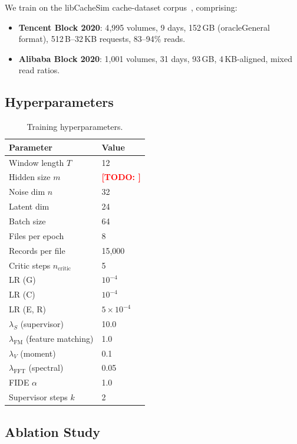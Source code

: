 \documentclass[10pt,twocolumn]{article}
\newcommand{\todo}[1]{\textcolor{red}{\textbf{[TODO: #1]}}}
\begin{document}
We train on the libCacheSim cache-dataset corpus~\cite{yang2021libcachesim,yang2023fifo},
comprising:
\begin{itemize}
  \item \textbf{Tencent Block 2020}: 4{,}995 volumes, 9 days, 152\,GB
    (oracleGeneral format), 512\,B--32\,KB requests, 83--94\% reads.
  \item \textbf{Alibaba Block 2020}: 1{,}001 volumes, 31 days, 93\,GB,
    4\,KB-aligned, mixed read ratios.
\end{itemize}

\subsection{Hyperparameters}

\begin{table}[h]
\centering
\small
\begin{tabular}{ll}
\toprule
Parameter & Value \\
\midrule
Window length $T$ & 12 \\
Hidden size $m$ & \todo{} \\
Noise dim $n$ & 32 \\
Latent dim & 24 \\
Batch size & 64 \\
Files per epoch & 8 \\
Records per file & 15{,}000 \\
Critic steps $n_{\text{critic}}$ & 5 \\
LR (G) & $10^{-4}$ \\
LR (C) & $10^{-4}$ \\
LR (E, R) & $5 \times 10^{-4}$ \\
$\lambda_S$ (supervisor) & 10.0 \\
$\lambda_{\text{FM}}$ (feature matching) & 1.0 \\
$\lambda_V$ (moment) & 0.1 \\
$\lambda_{\text{FFT}}$ (spectral) & 0.05 \\
FIDE $\alpha$ & 1.0 \\
Supervisor steps $k$ & 2 \\
\bottomrule
\end{tabular}
\caption{Training hyperparameters.}
\label{tab:hyperparams}
\end{table}

\subsection{Ablation Study}
\end{document}
